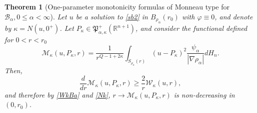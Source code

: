 \documentclass[11pt]{amsart}
\theoremstyle{plain}
\newtheorem{thrm}{Theorem}[section]
\numberwithin{equation}{section}
\begin{document}
\begin{thrm}[One-parameter monotonicity formulas of Monneau type for ${\mathcal{B}_\alpha}, 0\le \alpha <\infty$]\label{T:MBa}
Let $u$ be a solution to \eqref{sb2} in $B_{\rho_\alpha}(r_0)$ with ${\varphi} \equiv 0$, and denote by $\kappa = N(u,0^+)$. Let $P_\kappa\in \mathfrak P^+_{\alpha,\kappa}({\mathbb R}^{n+1})$,  and consider the functional defined for $0<r<r_0$
\begin{equation}\label{M}
\mathcal M_\kappa(u,P_\kappa,r) = \frac{1}{r^{Q-1+2\kappa}} \int_{{S_{\rho_\alpha}(r)}} (u - P_\kappa)^2 \frac{\psi_\alpha}{|\nabla {\rho_\alpha}|}dH_{n}.
\end{equation}
Then,
\begin{equation}\label{M'}
\frac{d}{dr} \mathcal M_\kappa(u,P_\kappa,r) \ge \frac{2}{r} \mathcal W_\kappa(u,r),
\end{equation}
and therefore by \eqref{WkBa} and \eqref{Nk}, $r \to  \mathcal M_\kappa(u,P_\kappa,r)$ is non-decreasing in $(0,r_0)$.
\end{thrm}
\end{document}
